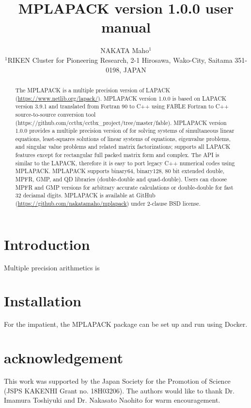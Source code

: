 \documentclass[12pt]{article}
\begin{document}
  
  \title{\sf MPLAPACK version 1.0.0 user manual}
  \author{NAKATA Maho$^1$\\
  \normalsize
  $^1$RIKEN Cluster for Pioneering Research, 2-1 Hirosawa, Wako-City, Saitama 351-0198, JAPAN}

\date{}

\maketitle

\begin{abstract}
The MPLAPACK is a multiple precision version of LAPACK (\url{https://www.netlib.org/lapack/}).
MPLAPACK version 1.0.0 is based on LAPACK version 3.9.1 and translated from Fortran 90 to C++ using FABLE Fortran to C++ source-to-source conversion tool (https://github.com/cctbx/cctbx\_project/tree/master/fable). 
MPLAPACK version 1.0.0 provides a multiple precision version of for solving systems of simultaneous linear equations, least-squares solutions of linear systems of equations, eigenvalue problems, and singular value problems and related matrix factorizations; supports all LAPACK features except for rectangular full packed matrix form and complex. The API is similar to the LAPACK, therefore it is easy to port legacy C++ numerical codes using MPLAPACK.
MPLAPACK supports binary64, binary128, 80 bit extended double, MPFR, GMP, and QD libraries (double-double and quad-double). 
Users can choose MPFR and GMP versions for arbitrary accurate calculations or double-double for fast 32 deciamal digits.
MPLAPACK is available at GitHub (\url{https://github.com/nakatamaho/mplapack}) under 2-clause BSD license.
\end{abstract}


\section{Introduction}
Multiple precision arithmetics is 

\section{Installation}
For the impatient, the MPLAPACK package can be set up and run using Docker\cite{merkel2014docker}.

\section{acknowledgement}
This work was supported by the Japan Society for the Promotion of Science (JSPS KAKENHI Grant no. 18H03206). The authors would like to thank Dr. Imamura Toshiyuki and Dr. Nakasato Naohito for warm encouragement.


\end{document}
